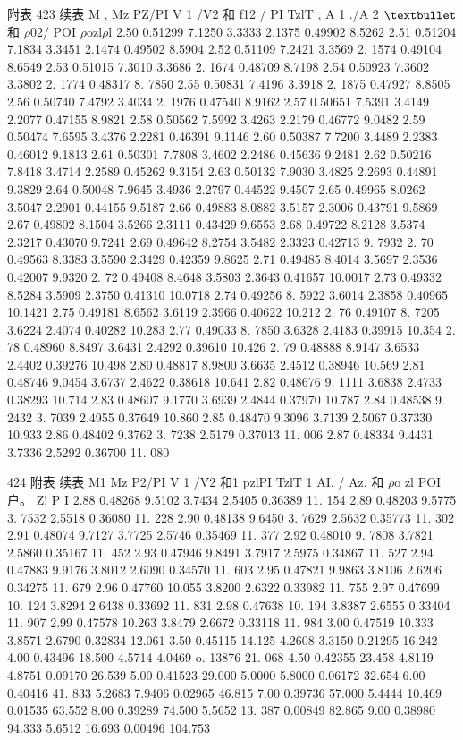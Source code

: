 附表 423 续表 M , Mz PZ/PI V 1 /V2 和 f12 / PI TzlT , A 1 ./A 2 ${\rm •}$ 和 $\rho$02/ POI $\rho$ozl$\rho$l 2.50 0.51299 7.1250 3.3333 2.1375 0.49902 8.5262 2.51 0.51204 7.1834 3.3451 2.1474 0.49502 8.5904 2.52 0.51109 7.2421 3.3569 2. 1574 0.49104 8.6549 2.53 0.51015 7.3010 3.3686 2. 1674 0.48709 8.7198 2.54 0.50923 7.3602 3.3802 2. 1774 0.48317 8. 7850 2.55 0.50831 7.4196 3.3918 2. 1875 0.47927 8.8505 2.56 0.50740 7.4792 3.4034 2. 1976 0.47540 8.9162 2.57 0.50651 7.5391 3.4149 2.2077 0.47155 8.9821 2.58 0.50562 7.5992 3.4263 2.2179 0.46772 9.0482 2.59 0.50474 7.6595 3.4376 2.2281 0.46391 9.1146 2.60 0.50387 7.7200 3.4489 2.2383 0.46012 9.1813 2.61 0.50301 7.7808 3.4602 2.2486 0.45636 9.2481 2.62 0.50216 7.8418 3.4714 2.2589 0.45262 9.3154 2.63 0.50132 7.9030 3.4825 2.2693 0.44891 9.3829 2.64 0.50048 7.9645 3.4936 2.2797 0.44522 9.4507 2.65 0.49965 8.0262 3.5047 2.2901 0.44155 9.5187 2.66 0.49883 8.0882 3.5157 2.3006 0.43791 9.5869 2.67 0.49802 8.1504 3.5266 2.3111 0.43429 9.6553 2.68 0.49722 8.2128 3.5374 2.3217 0.43070 9.7241 2.69 0.49642 8.2754 3.5482 2.3323 0.42713 9. 7932 2. 70 0.49563 8.3383 3.5590 2.3429 0.42359 9.8625 2.71 0.49485 8.4014 3.5697 2.3536 0.42007 9.9320 2. 72 0.49408 8.4648 3.5803 2.3643 0.41657 10.0017 2.73 0.49332 8.5284 3.5909 2.3750 0.41310 10.0718 2.74 0.49256 8. 5922 3.6014 2.3858 0.40965 10.1421 2.75 0.49181 8.6562 3.6119 2.3966 0.40622 10.212 2. 76 0.49107 8. 7205 3.6224 2.4074 0.40282 10.283 2.77 0.49033 8. 7850 3.6328 2.4183 0.39915 10.354 2. 78 0.48960 8.8497 3.6431 2.4292 0.39610 10.426 2. 79 0.48888 8.9147 3.6533 2.4402 0.39276 10.498 2.80 0.48817 8.9800 3.6635 2.4512 0.38946 10.569 2.81 0.48746 9.0454 3.6737 2.4622 0.38618 10.641 2.82 0.48676 9. 1111 3.6838 2.4733 0.38293 10.714 2.83 0.48607 9.1770 3.6939 2.4844 0.37970 10.787 2.84 0.48538 9. 2432 3. 7039 2.4955 0.37649 10.860 2.85 0.48470 9.3096 3.7139 2.5067 0.37330 10.933 2.86 0.48402 9.3762 3. 7238 2.5179 0.37013 11. 006 2.87 0.48334 9.4431 3.7336 2.5292 0.36700 11. 080

424 附表 续表 M1 Mz P2/PI V 1 /V2 和1 pzlPI TzlT 1 AI. / Az. 和 $\rho$o zl POI 户。 Z! P I 2.88 0.48268 9.5102 3.7434 2.5405 0.36389 11. 154 2.89 0.48203 9.5775 3. 7532 2.5518 0.36080 11. 228 2.90 0.48138 9.6450 3. 7629 2.5632 0.35773 11. 302 2.91 0.48074 9.7127 3.7725 2.5746 0.35469 11. 377 2.92 0.48010 9. 7808 3.7821 2.5860 0.35167 11. 452 2.93 0.47946 9.8491 3.7917 2.5975 0.34867 11. 527 2.94 0.47883 9.9176 3.8012 2.6090 0.34570 11. 603 2.95 0.47821 9.9863 3.8106 2.6206 0.34275 11. 679 2.96 0.47760 10.055 3.8200 2.6322 0.33982 11. 755 2.97 0.47699 10. 124 3.8294 2.6438 0.33692 11. 831 2.98 0.47638 10. 194 3.8387 2.6555 0.33404 11. 907 2.99 0.47578 10.263 3.8479 2.6672 0.33118 11. 984 3.00 0.47519 10.333 3.8571 2.6790 0.32834 12.061 3.50 0.45115 14.125 4.2608 3.3150 0.21295 16.242 4.00 0.43496 18.500 4.5714 4.0469 o. 13876 21. 068 4.50 0.42355 23.458 4.8119 4.8751 0.09170 26.539 5.00 0.41523 29.000 5.0000 5.8000 0.06172 32.654 6.00 0.40416 41. 833 5.2683 7.9406 0.02965 46.815 7.00 0.39736 57.000 5.4444 10.469 0.01535 63.552 8.00 0.39289 74.500 5.5652 13. 387 0.00849 82.865 9.00 0.38980 94.333 5.6512 16.693 0.00496 104.753

